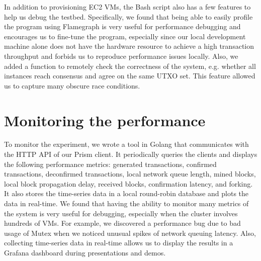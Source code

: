 In addition to provisioning EC2 VMs, the Bash script also has a few features to help us debug the testbed. Specifically, we found that being able to easily profile the program using Flamegraph is very useful for performance debugging and encourages us to fine-tune the program, especially since our local development machine alone does not have the hardware resource to achieve a high transaction throughput and forbids us to reproduce performance issues locally. Also, we added a function to remotely check the correctness of the system, e.g. whether all instances reach consensus and agree on the same UTXO set. This feature allowed us to capture many obscure race conditions.

\section{Monitoring the performance}

To monitor the experiment, we wrote a tool in Golang that communicates with the HTTP API of our Prism client. It periodically queries the clients and displays the following performance metrics: generated transactions, confirmed transactions, deconfirmed transactions, local network queue length, mined blocks, local block propagation delay, received blocks, confirmation latency, and forking. It also stores the time-series data in a local round-robin database and plots the data in real-time. We found that having the ability to monitor many metrics of the system is very useful for debugging, especially when the cluster involves hundreds of VMs. For example, we discovered a performance bug due to bad usage of Mutex when we noticed unusual spikes of network queuing latency. Also, collecting time-series data in real-time allows us to display the results in a Grafana dashboard during presentations and demos.
